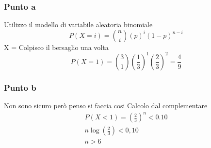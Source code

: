 \documentclass[12pt]{article}
\begin{document}
\subsubsection*{Punto a}
Utilizzo il modello di variabile aleatoria binomiale
\[
P(X=i) = \binom{n}{i} (p)^i (1-p)^{n-i}    
\]
X = Colpisco il bersaglio una volta
\[
P(X=1) = \binom{3}{1} \left(\frac{1}{3}\right)^1 \left(\frac{2}{3}\right)^2 = \frac{4}{9}   
\]  

\subsubsection*{Punto b}
Non sono sicuro però penso si faccia cosi
\newline
Calcolo dal complementare
\begin{align*}
    P(X<1) = \left(\frac{2}{3}\right)^n < 0.10 \\
    n\log(\frac{2}{3}) < 0,10 \\
    n > 6
\end{align*}
\end{document}
